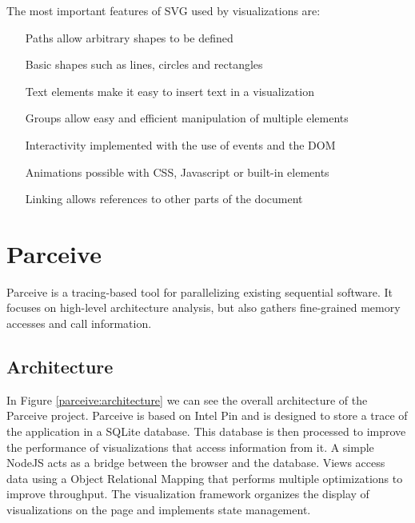 The most important features of SVG used by visualizations are:

\begin{itemize}
	\item[Paths] allow arbitrary shapes to be defined
	\item[Basic shapes] such as lines, circles and rectangles
	\item[Text elements] make it easy to insert text in a visualization
	\item[Groups] allow easy and efficient manipulation of multiple elements
	\item[Interactivity] implemented with the use of events and the DOM
	\item[Animations] possible with CSS, Javascript or built-in elements
	\item[Linking] allows references to other parts of the document
\end{itemize}

\section{Parceive}

Parceive \cite{parceive} is a tracing-based tool for parallelizing existing sequential software. It focuses on high-level architecture analysis, but also gathers fine-grained memory accesses and call information.

\subsection{Architecture}

In Figure \ref{parceive:architecture} we can see the overall architecture of the Parceive project. Parceive is based on Intel Pin and is designed to store a trace of the application in a SQLite database. This database is then processed to improve the performance of visualizations that access information from it. A simple NodeJS acts as a bridge between the browser and the database. Views access data using a Object Relational Mapping that performs multiple optimizations to improve throughput. The visualization framework organizes the display of visualizations on the page and implements state management.

